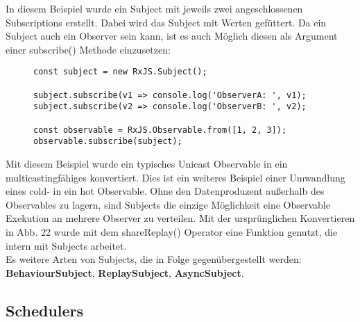 \noindent
In diesem Beispiel wurde ein Subject mit jeweils zwei angeschlossenen Subscriptions erstellt. Dabei wird das Subject mit Werten \glqq gefüttert\grqq. Da ein Subject auch ein Observer sein kann, ist es auch Möglich diesen als Argument einer subscribe() Methode einzusetzen:

\begin{figure}[H]
\begin{lstlisting}[basicstyle=\small]
const subject = new RxJS.Subject();

subject.subscribe(v1 => console.log('ObserverA: ', v1);
subject.subscribe(v2 => console.log('ObserverB: ', v2);

const observable = RxJS.Observable.from([1, 2, 3]);
observable.subscribe(subject);
\end{lstlisting}
\end{figure}

\noindent
Mit diesem Beispiel wurde ein typisches Unicast Observable in ein multicastingfähiges konvertiert. Dies ist ein weiteres Beispiel einer Umwandlung eines cold- in ein hot Observable. Ohne den Datenproduzent außerhalb des Observables zu lagern, sind Subjects die einzige Möglichkeit eine Observable Exekution an mehrere Observer zu verteilen. Mit der ursprünglichen Konvertieren in Abb. 22 wurde mit dem shareReplay() Operator eine Funktion genutzt, die intern mit Subjects arbeitet.\\

\noindent
Es weitere Arten von Subjects, die in Folge gegenübergestellt werden: \textbf{BehaviourSubject}, \textbf{ReplaySubject}, \textbf{AsyncSubject}.

\subsection{Schedulers}

